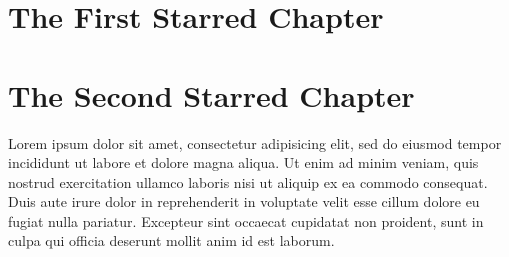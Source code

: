 \documentclass[10pt,a4paper,extrafontsizes,oldfontcommands,oneside]{memoir}
\begin{document}
\clearpage

\begin{hideshorttoc}

\printtoc

\end{hideshorttoc}

\clearpage

\listoffigures
\clearpage
\listoftables
\clearpage




\printglossary

\clearpage


\mainmatter

\chapter*{The First Starred Chapter} %
\label{chap:the_first_starred_chapter}


\chapter*{The Second Starred Chapter} %
\label{chap:the_second_starred_chapter}

Lorem ipsum dolor sit amet, consectetur adipisicing elit, sed do eiusmod tempor incididunt ut labore et dolore magna aliqua. Ut enim ad minim veniam, quis nostrud exercitation ullamco laboris nisi ut aliquip ex ea commodo consequat. Duis aute irure dolor in reprehenderit in voluptate velit esse cillum dolore eu fugiat nulla pariatur. Excepteur sint occaecat cupidatat non proident, sunt in culpa qui officia deserunt mollit anim id est laborum.
\end{document}
